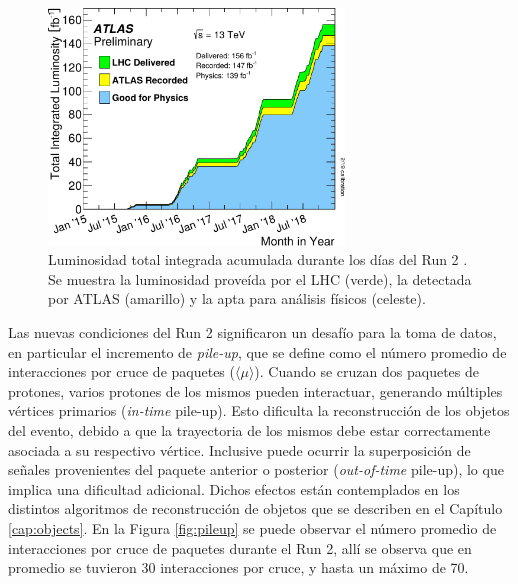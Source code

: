 \begin{figure}
  \centering
  \includegraphics[width=0.7\textwidth]{images/lhc/intlumivstimeRun2DQall_v2.pdf}
  \caption{Luminosidad total integrada acumulada durante los días del Run 2 \cite{lumi_plot}. Se muestra la luminosidad proveída por el LHC (verde), la detectada por ATLAS (amarillo) y la apta para análisis físicos (celeste).}
  \label{fig:run2_lumi}
\end{figure}

Las nuevas condiciones del Run 2 significaron un desafío para la toma de datos, en particular el incremento de \textit{pile-up}, que se define como el número promedio de interacciones por cruce de paquetes ($\langle \mu \rangle$). Cuando se cruzan dos paquetes de protones, varios protones de los mismos pueden interactuar, generando múltiples vértices primarios (\textit{in-time} pile-up). Esto dificulta la reconstrucción de los objetos del evento, debido a que la trayectoria de los mismos debe estar correctamente asociada a su respectivo vértice. Inclusive puede ocurrir la superposición de señales provenientes del paquete anterior o posterior (\textit{out-of-time} pile-up), lo que implica una dificultad adicional. Dichos efectos están contemplados en los distintos algoritmos de reconstrucción de objetos que se describen en el Capítulo \ref{cap:objects}. En la Figura \ref{fig:pileup} se puede observar el número promedio de interacciones por cruce de paquetes durante el Run 2, allí se observa que en promedio se tuvieron 30 interacciones por cruce, y hasta un máximo de 70. 

